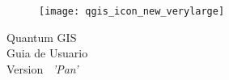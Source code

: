 
\begin{titlepage}
\begin{center}

\begin{figure}[H]
\begin{center}
\texttt{[image: qgis\_icon\_new\_verylarge]} 
\end{center}
\end{figure}

\Huge{Quantum GIS}\\
\vspace{0.5cm}
\Large{Guia de Usuario} \\
\vspace{0.5cm}
\Large{Version ~\CURRENT \textsl{'Pan'}}

\end{center}
\end{titlepage}
